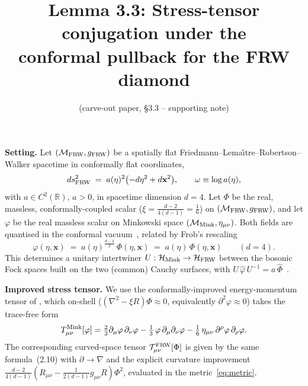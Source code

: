 \documentclass[11pt]{article}
\title{Lemma 3.3: Stress-tensor conjugation under the\\
       conformal pullback for the FRW diamond}
\author{(carve-out paper, \S 3.3 -- supporting note)}
\date{}
\begin{document}
\maketitle

\noindent\textbf{Setting.}  Let
$(\mathcal{M}_{\rm FRW},g_{\rm FRW})$ be a spatially flat
Friedmann--Lema{\^\i}tre--Robertson--Walker spacetime in conformally flat
coordinates,
\begin{equation}
   ds^2_{\rm FRW} \;=\; a(\eta)^2 \bigl( -d\eta^2 + d\mathbf{x}^2 \bigr),
   \qquad \omega \equiv \log a(\eta),
   \label{eq:metric}
\end{equation}
with $a\in C^2(\mathbb{R})$, $a>0$, in spacetime dimension $d=4$.  Let
$\Phi$ be the real, massless, conformally-coupled scalar
($\xi=\frac{d-2}{4(d-1)}=\frac16$) on $(\mathcal{M}_{\rm FRW},g_{\rm FRW})$,
and let $\varphi$ be the real massless scalar on Minkowski space
$(\mathcal{M}_{\rm Mink},\eta_{\mu\nu})$.  Both fields are quantised in the
conformal vacuum~\cite{BirrellDavies}, related by Frob's rescaling
\cite[eq.~(3.5)]{Frob2023}
\begin{equation}
   \varphi(\eta,\mathbf{x}) \;=\; a(\eta)^{\frac{d-2}{2}}\,
   \Phi(\eta,\mathbf{x})
   \;=\; a(\eta)\,\Phi(\eta,\mathbf{x})
   \qquad (d=4).
   \label{eq:rescale}
\end{equation}
This determines a unitary intertwiner $U:\mathcal{H}_{\rm Mink}\to
\mathcal{H}_{\rm FRW}$ between the bosonic Fock spaces built on the two
(common) Cauchy surfaces, with $U\,\hat{\varphi}\,U^{-1}=
a\,\hat{\Phi}$~\cite[\S3.2]{Frob2023}.

\medskip
\noindent\textbf{Improved stress tensor.}  We use the conformally-improved
energy-momentum tensor of \cite[eq.~(2.10), eq.~(3.6)]{Frob2023}, which
on-shell ($(\nabla^2-\xi R)\Phi\approx 0$, equivalently
$\partial^2\varphi\approx 0$) takes the trace-free form
\begin{equation}
   T^{\rm Mink}_{\mu\nu}[\varphi]
   = \tfrac{2}{3}\partial_\mu\varphi\,\partial_\nu\varphi
     - \tfrac{1}{3}\,\varphi\,\partial_\mu\partial_\nu\varphi
     - \tfrac{1}{6}\,\eta_{\mu\nu}\,\partial^\rho\varphi\,\partial_\rho\varphi.
   \label{eq:Tmink}
\end{equation}
The corresponding curved-space tensor $\mathcal{T}^{\rm FRW}_{\mu\nu}[\Phi]$
is given by the same formula~(2.10) with $\partial\to\nabla$ and the
explicit curvature improvement $\frac{d-2}{4(d-1)}(R_{\mu\nu}-\frac{1}{2(d-1)}
g_{\mu\nu}R)\Phi^2$, evaluated in the metric~\eqref{eq:metric}.
\end{document}
